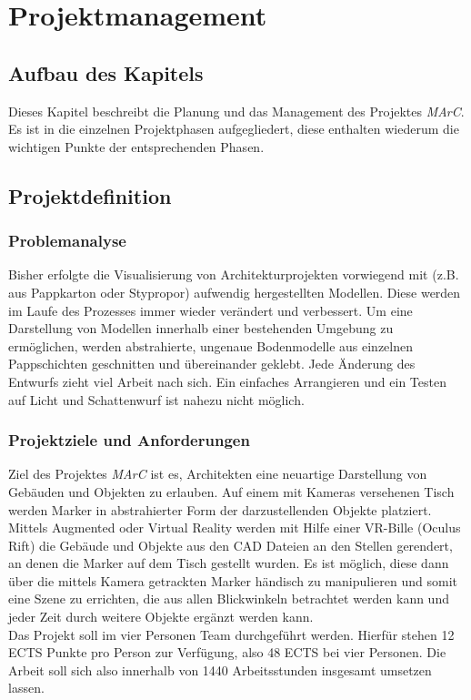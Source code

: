 \section{Projektmanagement} \label{sec:pm}

\subsection{Aufbau des Kapitels}
Dieses Kapitel beschreibt die Planung und das Management des Projektes \textit{MArC}. Es ist in die einzelnen Projektphasen aufgegliedert, diese enthalten wiederum die wichtigen Punkte der entsprechenden Phasen.

\subsection{Projektdefinition}
\subsubsection{Problemanalyse}
Bisher erfolgte die Visualisierung von Architekturprojekten vorwiegend mit (z.B. aus Pappkarton oder Stypropor) aufwendig hergestellten Modellen. Diese werden im Laufe des Prozesses immer wieder verändert und verbessert.
Um eine Darstellung von Modellen innerhalb einer bestehenden Umgebung zu ermöglichen, werden abstrahierte, ungenaue Bodenmodelle aus einzelnen Pappschichten geschnitten und übereinander geklebt. Jede Änderung des Entwurfs zieht viel Arbeit nach sich. Ein einfaches Arrangieren und ein Testen auf Licht und Schattenwurf ist nahezu nicht möglich.


\subsubsection{Projektziele und Anforderungen}
Ziel des Projektes \textit{MArC} ist es, Architekten eine neuartige Darstellung von Gebäuden und Objekten zu erlauben. Auf einem mit Kameras versehenen Tisch werden Marker in abstrahierter Form der darzustellenden Objekte platziert. Mittels Augmented oder Virtual Reality werden mit Hilfe einer VR-Bille (Oculus Rift) die Gebäude und Objekte aus den CAD Dateien an den Stellen gerendert, an denen die Marker auf dem Tisch gestellt wurden.
Es ist möglich, diese dann über die mittels Kamera getrackten Marker händisch zu manipulieren und somit eine Szene zu errichten, die aus allen Blickwinkeln betrachtet werden kann und jeder Zeit durch weitere Objekte ergänzt werden kann. \\
Das Projekt soll im vier Personen Team durchgeführt werden. Hierfür stehen 12 ECTS Punkte pro Person zur Verfügung, also 48 ECTS bei vier Personen. Die Arbeit soll sich also innerhalb von 1440 Arbeitsstunden insgesamt umsetzen lassen.


